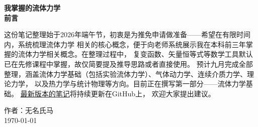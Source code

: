\thispagestyle{empty}
\begin{center}
    \Huge{\textbf{我掌握的流体力学}}\\
    \vspace{1.5cm}
    \Huge\textbf{前言}
\end{center}

这份笔记整理始于2026年端午节，初衷是为推免申请做准备——希望在有限时间内，系统梳理流体力学
相关的核心概念，便于向老师系统展示我在本科前三年掌握的流体力学相关概念。在整理过程中，
复变函数、矢量恒等式等数学工具默认已在先修课程中掌握，故仅简要提及推导思路或者直接使用。
预计九月完成全部整理，涵盖流体力学基础（包括实验流体力学）、气体动力学、连续介质力学、理论力学，
以及热力学与统计物理等方向。目前正在撰写第一部分——流体力学基础。
\href{https://github.com/nobodyMa/nobodyMa_note_review_Fluiddynamics/blob/main/%E6%88%91%E6%8E%8C%E6%8F%A1%E7%9A%84%E6%B5%81%E4%BD%93%E5%8A%9B%E5%AD%A6.pdf}{最新版本的笔记}将持续更新在GitHub上，
欢迎大家提出建议。
\vspace{0.5cm}

\begin{flushright}
    作者：无名氏马\\
    \today
\end{flushright}

\newpage                      %
\pagestyle{plain}             %
\setcounter{page}{1}          %
\tableofcontents              %

\newpage                      %
\pagestyle{plain}
\setcounter{page}{1}          %
